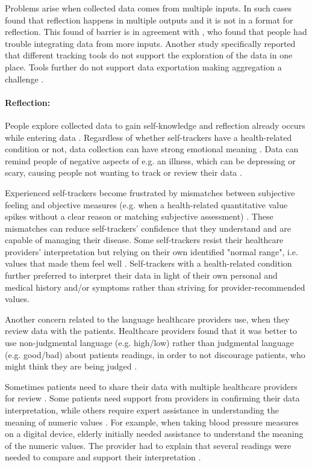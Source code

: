 Problems arise when collected data comes from multiple inputs. In such cases \citep{Li2010} found that reflection happens in multiple outputs and it is not in a format for reflection. This found of barrier is in agreement with \citep{Rooksby2014}, who found that people had trouble integrating data from more inputs. Another study specifically reported that different tracking tools do not support the exploration of the data in one place. Tools further do not support data exportation making aggregation a challenge \citep{Li2011}. 

\paragraph{Reflection:}
People explore collected data to gain self-knowledge and reflection already occurs while entering data \citep{Whooley2014, MacLeod2014, Epstein2015}. Regardless of whether self-trackers have a health-related condition or not, data collection can have strong emotional meaning \citep{Li2010, Ancker2015}. Data can remind people of negative aspects of e.g. an illness, which can be depressing or scary, causing people not wanting to track or review their data \citep{Ancker2015}. 

Experienced self-trackers become frustrated by mismatches between subjective feeling and objective measures (e.g. when a health-related quantitative value spikes without a clear reason or matching subjective assessment) \citep{Ancker2015}. These mismatches can reduce self-trackers' confidence that they understand and are capable of managing their disease. Some self-trackers resist their healthcare providers' interpretation but relying on their own identified "normal range", i.e. values that made them feel well \citep{Ancker2015}. Self-trackers with a health-related condition further preferred to interpret their data in light of their own personal and medical history and/or symptoms rather than striving for provider-recommended values. 

Another concern related to the language healthcare providers use, when they review data with the patients. Healthcare providers found that it was better to use non-judgmental language (e.g. high/low) rather than judgmental language (e.g. good/bad) about patients readings, in order to not discourage patients, who might think they are being judged \citep{Ancker2015}. 

Sometimes patients need to share their data with multiple healthcare providers for review \citep{Chung2016}. Some patients need support from providers in confirming their data interpretation, while others require expert assistance in understanding the meaning of numeric values \citep{Verdezoto2015}. For example, when taking blood pressure measures on a digital device, elderly initially needed assistance to understand the meaning of the numeric values. The provider had to explain that several readings were needed to compare and support their interpretation \citep{Verdezoto2015}. 

